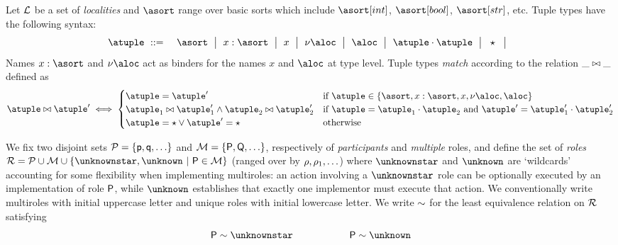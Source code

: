 %
Let $\mathcal{L}$ be a set of \emph{localities} and $\asort$ range over
basic sorts which include $\asort[int]$, $\asort[bool]$,
$\asort[str]$, etc.
%
Tuple types have the following syntax:
\begin{eqnarray*}
  \atuple & \bnfdef & \asort \bnfmid
                      x : \asort \bnfmid
                      x  \bnfmid
                      \nu \aloc \bnfmid
                      \aloc \bnfmid
                      \atuple \cdot \atuple \bnfmid
                      \wildcard \bnfmid
\end{eqnarray*}
Names $x : \asort$ and $\nu \aloc$ act as binders for the names $x$ and $\aloc$ at type level. 
%
Tuple types \emph{match} according to the relation $\_ \bowtie \_$
defined as
\[
  \atuple \matches \atuple' \iff
  \begin{cases}
    \atuple = \atuple'  
    & 
    \text{if $\atuple\in\{\asort, x : \asort, x, \nu \aloc, \aloc\}$}
    \\
    \atuple_1 \matches \atuple'_1
    \land \atuple_2 \matches \atuple'_2
    &
    \text{if } \atuple = \atuple_1 \cdot \atuple_2
    \text{ and }  \atuple' = \atuple'_1 \cdot \atuple'_2
    \\
    \atuple = \wildcard \vee \atuple' = \wildcard & \text{otherwise}
  \end{cases}
\]

%

We fix two disjoint sets $\participants = \{\ptp p, \ptp q, \ldots\}$
and $\multiroles = \{\amulti P, \amulti Q, \ldots \}$, respectively of
\emph{participants} and \emph{multiple} roles, and define the set of
\emph{roles} $\roleset = \participants \cup \multiroles \cup
\{\unknownstar, \unknown\ |\ \amulti P \in\multiroles\}$ (ranged over by
$\rho, \rho_1, \ldots$) where $\unknownstar$ and $\unknown$ are
`wildcards' accounting for some flexibility when implementing
multiroles: an action involving a $\unknownstar$ role can be
optionally executed by an implementation of role $\amulti P$, while
$\unknown$ establishes that exactly one implementor must execute that
action.
%
We conventionally write multiroles with initial uppercase letter and
unique roles with initial lowercase letter. We write $\sim$ for the 
least equivalence relation on $\mathcal{R}$ satisfying 
\[\amulti P \eqR \unknownstar \hspace{2cm} \amulti P \eqR \unknown\]



